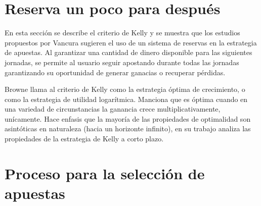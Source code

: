 \section{Reserva un poco para después}
\label{sec:kelly}

En esta sección se describe el criterio de Kelly \cite{kelly1956new} y se muestra que los estudios propuestos por Vancura \cite{vancura2000finding} sugieren el uso de un sistema de reservas en la estrategia de apuestas. Al garantizar una cantidad de dinero disponible para las siguientes jornadas, se permite al usuario seguir apostando durante todas las jornadas garantizando su oportunidad de generar ganacias o recuperar pérdidas.


Browne \cite{browne2000can} llama al criterio de Kelly \cite{kelly1956new} como la estrategia óptima de crecimiento, o como la estrategia de utilidad logarítmica. Manciona que es óptima cuando en una variedad de circunstancias la ganancia crece multiplicativamente, unícamente. Hace enfasis 	que la mayoría de las propiedades de optimalidad son asintóticas en naturaleza (hacia un horizonte infinito), en su trabajo analiza las propiedades de la estrategia de Kelly a corto plazo.

\cite{kelly1956new}
\cite{vancura2000finding}

 \section{Proceso para la selección de apuestas}

%
%
 

